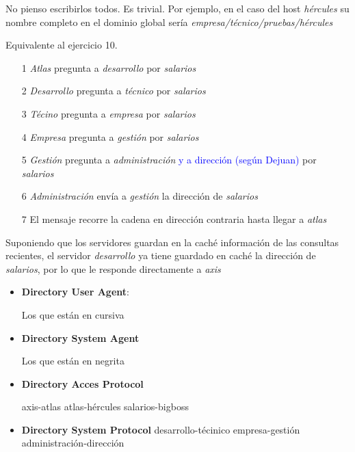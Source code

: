 \begin{problem}[12]
\solution

\yoP

\spart

No pienso escribirlos todos. Es trivial. Por ejemplo, en el caso del host \textit{hércules} su nombre completo en el dominio global sería \textit{empresa/técnico/pruebas/hércules}

\spart

Equivalente al ejercicio 10.

\begin{enumerate}
\item[1] \textit{Atlas} pregunta a \textit{desarrollo} por \textit{salarios}
\item[2] \textit{Desarrollo} pregunta a \textit{técnico} por \textit{salarios}
\item[3] \textit{Técino} pregunta a \textit{empresa} por \textit{salarios}
\item[4] \textit{Empresa} pregunta a \textit{gestión} por \textit{salarios}
\item[5] \textit{Gestión} pregunta a \textit{administración} \textcolor{blue}{y a dirección (según Dejuan)} por \textit{salarios}
\item[6] \textit{Administración} envía a \textit{gestión} la dirección de \textit{salarios}
\item[7] El mensaje recorre la cadena en dirección contraria hasta llegar a \textit{atlas}
\end{enumerate}

\spart

Suponiendo que los servidores guardan en la caché información de las consultas recientes, el servidor \textit{desarrollo} ya tiene guardado en caché la dirección de \textit{salarios}, por lo que le responde directamente a \textit{axis}

\spart

\begin{itemize}
\item \textbf{Directory User Agent}:

Los que están en cursiva
\item \textbf{Directory System Agent}

Los que están en negrita
\item \textbf{Directory Acces Protocol}

\subitem axis-atlas
\subitem atlas-hércules
\subitem salarios-bigboss

\item \textbf{Directory System Protocol}
\subitem desarrollo-técinico
\subitem empresa-gestión
\subitem administración-dirección
\end{itemize}


\end{problem}
